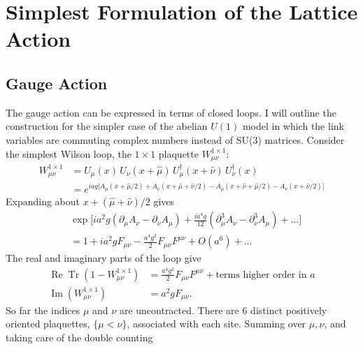 \chapter{Simplest Formulation of the Lattice Action}

\section{Gauge Action}

The gauge action can be expressed in terms of closed loops. I will outline
the construction for the simpler case of the abelian $U(1)$ model in which
the link variables are commuting complex numbers instead of SU(3) matrices.
Consider the simplest Wilson loop, the $1\times1$ plaquette
$W_{\mu\nu}^{1\times1}$:
\begin{equation}
\label{eq:plaqexpA}
\begin{aligned}
W_{\mu\nu}^{1\times1} &= U_\mu(x)\, U_\nu(x+\hat{\mu})\, U_\mu^\dagger(x+\hat{\nu})\, U_\nu^\dagger(x) \\
&= e^{iag\big[ A_\mu(x+\hat{\mu}/2) + A_\nu(x+\hat{\mu}+\hat{\nu}/2) -
          A_\mu(x+\hat{\nu}+\hat{\mu}/2) - A_\nu(x+\hat{\nu}/2) \big]}
\end{aligned}
\end{equation}
Expanding about $x + (\hat{\mu}+\hat{\nu})/2$ gives
\begin{equation}
\label{eq:plaqexpB}
\begin{aligned}
&\exp\Big[ ia^2g(\partial_\mu A_\nu - \partial_\nu A_\mu) +
       \frac{ia^4g}{12}(\partial_\mu^3 A_\nu - \partial_\nu^3 A_\mu) + \ldots \Big] \\
&= 1 + ia^2gF_{\mu\nu} - \frac{a^4g^2}{2}F_{\mu\nu}F^{\mu\nu} + O(a^6) + \ldots
\end{aligned}
\end{equation}
The real and imaginary parts of the loop give
\begin{equation}
\label{eq:plaqexpC}
\begin{aligned}
\operatorname{Re}\operatorname{Tr}(1-W_{\mu\nu}^{1\times1}) &=
   \frac{a^4g^2}{2}F_{\mu\nu}F^{\mu\nu} + \text{terms higher order in } a \\
\operatorname{Im}(W_{\mu\nu}^{1\times1}) &= a^2gF_{\mu\nu} .
\end{aligned}
\end{equation}
So far the indices $\mu$ and $\nu$ are uncontracted. There are $6$
distinct positively oriented plaquettes, $\{\mu<\nu\}$, associated with
each site. Summing over $\mu,\nu$, and taking care of the double counting
